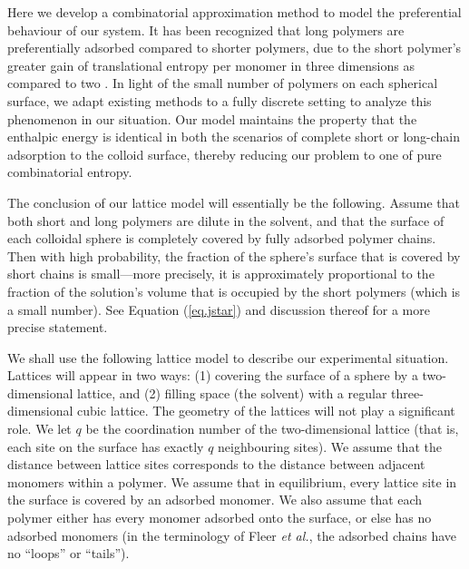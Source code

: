 \documentclass[journal=mamobx,manuscript=article]{achemso}
\begin{document}
Here we develop a combinatorial approximation method %
to model the preferential behaviour of our system.
It has been recognized that long polymers are
preferentially adsorbed compared to shorter polymers,
due to the short polymer's greater gain of
translational entropy per monomer in three dimensions
as compared to two 
\cite{Fleer1993}.  
In light of the small number of polymers on each
spherical surface, we adapt existing methods to a
fully discrete setting to analyze this phenomenon in our
situation.  Our model maintains the property that the enthalpic energy is identical in both the scenarios of complete short or long-chain adsorption to the colloid surface, thereby reducing our problem
to one of pure combinatorial entropy. 

The conclusion of our lattice model will essentially
be the following. 
Assume that both short and long polymers 
are dilute in the solvent, and that the 
surface of each colloidal sphere is completely covered 
by fully adsorbed polymer chains.  Then with high probability, 
the fraction of the sphere's surface that is 
covered by short chains is small---more precisely, it 
is approximately proportional
to the fraction of the solution's volume that is
occupied by the short polymers (which is a small
number).  See  Equation (\ref{eq.jstar}) and discussion thereof for a more precise statement.


We shall use the following lattice model to describe our experimental situation.  
Lattices will appear in two ways:  (1) covering the surface of a sphere by a two-dimensional lattice, and
(2) filling space (the solvent) with a regular three-dimensional cubic lattice.  
The geometry of the lattices will not play a significant role.  
We let $q$ be the coordination number of the two-dimensional lattice 
(that is, each site on the surface has exactly $q$ neighbouring sites).  We assume that 
the distance between lattice sites corresponds to the distance between adjacent monomers within a polymer.  
We assume that in equilibrium, every lattice site in the surface is covered by an adsorbed monomer.
We also assume that each polymer either has every monomer adsorbed onto the surface, or else has no adsorbed monomers (in the terminology of Fleer \textit{et al.}\cite{Fleer1993}, the adsorbed chains
have no ``loops'' or ``tails'').
\end{document}
